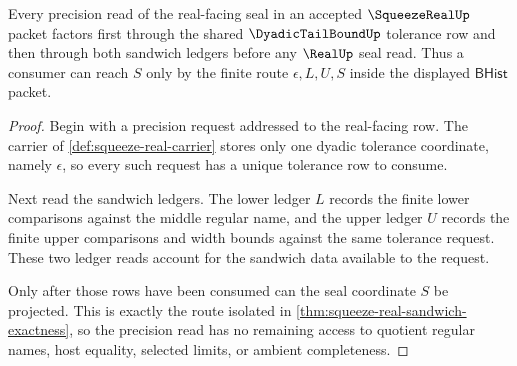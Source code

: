 \begin{theorem}
\label{thm:squeeze-real-dyadic-tail-exhaustion}
Every precision read of the real-facing seal in an accepted $\SqueezeRealUp$ packet factors first through the shared $\DyadicTailBoundUp$ tolerance row and then through both sandwich ledgers before any $\RealUp$ seal read. Thus a consumer can reach $S$ only by the finite route $\epsilon,L,U,S$ inside the displayed $\mathsf{BHist}$ packet.
\end{theorem}
\begin{proof}
Begin with a precision request addressed to the real-facing row. The carrier of \autoref{def:squeeze-real-carrier} stores only one dyadic tolerance coordinate, namely $\epsilon$, so every such request has a unique tolerance row to consume.

Next read the sandwich ledgers. The lower ledger $L$ records the finite lower comparisons against the middle regular name, and the upper ledger $U$ records the finite upper comparisons and width bounds against the same tolerance request. These two ledger reads account for the sandwich data available to the request.

Only after those rows have been consumed can the seal coordinate $S$ be projected. This is exactly the route isolated in \autoref{thm:squeeze-real-sandwich-exactness}, so the precision read has no remaining access to quotient regular names, host equality, selected limits, or ambient completeness.
\end{proof}

